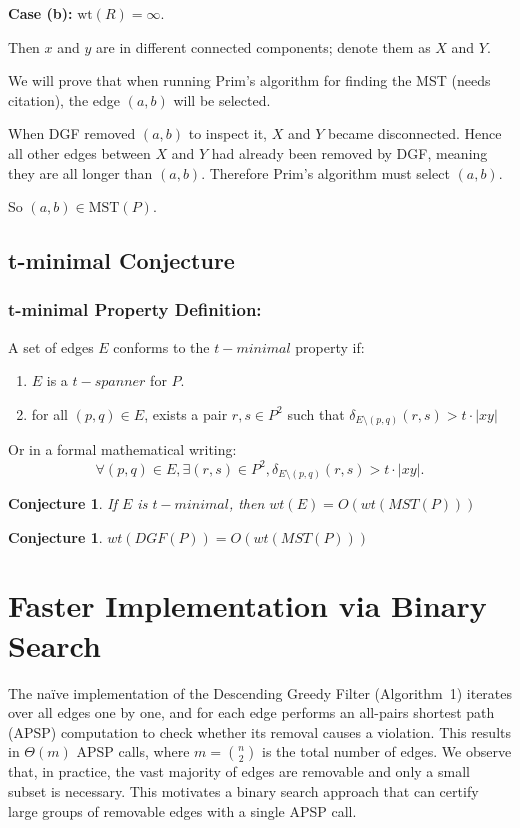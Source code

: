 \documentclass{article}
\newtheorem{conjecture}[theorem]{Conjecture}
\begin{document}
\textbf{Case (b):} $\mathrm{wt}(R) = \infty$.

Then $x$ and $y$ are in different connected components; denote them as $X$ and $Y$.

We will prove that when running Prim's algorithm for finding the MST (needs citation), the edge $(a,b)$ will be selected.

When DGF removed $(a,b)$ to inspect it, $X$ and $Y$ became disconnected. Hence all other edges between $X$ and $Y$ had already been removed by DGF, meaning they are all longer than $(a,b)$. Therefore Prim's algorithm must select $(a,b)$.

So $(a,b) \in \text{MST}(P)$.

\subsection{t-minimal Conjecture}

\subsubsection{t-minimal Property Definition:}

A set of edges $E$ conforms to the $t-minimal$ property if:
\begin{enumerate}
    \item $E$ is a $t-spanner$ for $P$.
    \item for all $(p,q) \in E$, exists a pair $r,s \in P^2$ such that $\delta_{E \setminus (p,q)}(r,s) > t \cdot |x y|$\\
\end{enumerate}
Or in a formal mathematical writing:\\
\[
\forall (p,q) \in E, \exists (r, s) \in P^2, \delta_{E \setminus (p,q)}(r,s) > t \cdot |x y|.
\]

\begin{conjecture}
    If $E$ is $t-minimal$, then $wt(E) = O(wt(MST(P)))$\\
\end{conjecture}
%
\begin{conjecture}
    $wt(DGF(P)) = O(wt(MST(P)))$\\
\end{conjecture}


\section{Faster Implementation via Binary Search}

The na\"ive implementation of the Descending Greedy Filter (Algorithm~1) iterates over all edges one by one, and for each edge performs an all-pairs shortest path (APSP) computation to check whether its removal causes a violation. This results in $\Theta(m)$ APSP calls, where $m = \binom{n}{2}$ is the total number of edges. We observe that, in practice, the vast majority of edges are removable and only a small subset is necessary. This motivates a binary search approach that can certify large groups of removable edges with a single APSP call.
\end{document}
